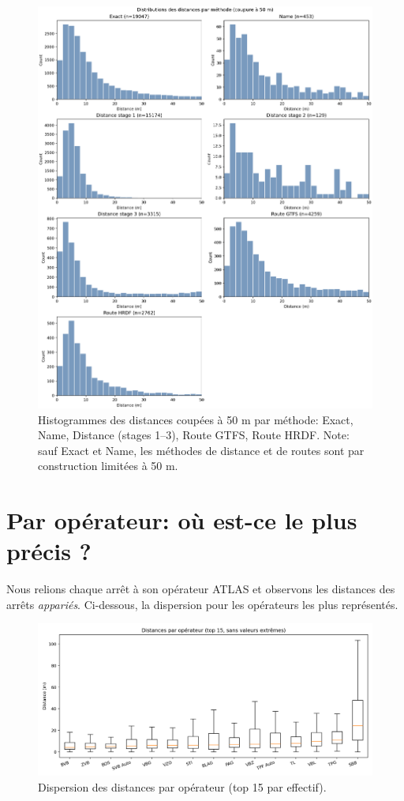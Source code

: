 \begin{figure}[H]
    \centering
    \includegraphics[width=\textwidth]{../figures/chap5/distance_distributions_methods_0_50.png}
    \caption[Histogrammes par méthode (0–50 m)]{Histogrammes des distances coupées à 50 m par méthode: Exact, Name, Distance (stages 1–3), Route GTFS, Route HRDF. Note: sauf Exact et Name, les méthodes de distance et de routes sont par construction limitées à 50 m.}
\end{figure}

\section{Par opérateur: où est-ce le plus précis ?}

Nous relions chaque arrêt à son opérateur ATLAS et observons les distances des arrêts \textit{appariés}. Ci-dessous, la dispersion pour les opérateurs les plus représentés.

\begin{figure}[H]
    \centering
    \includegraphics[width=\textwidth]{../figures/chap5/distances_by_operator_box.png}
    \caption[Distances par opérateur]{Dispersion des distances par opérateur (top 15 par effectif).}
\end{figure}

